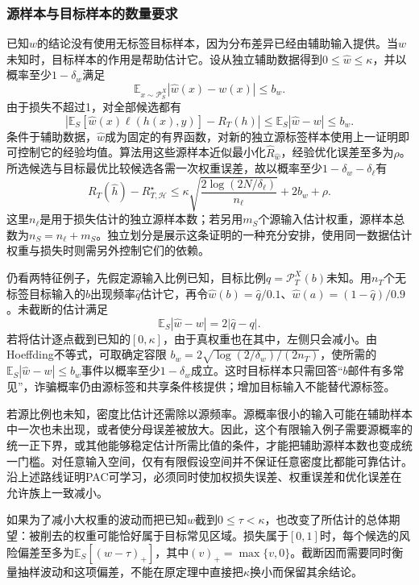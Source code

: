 \subsubsection{源样本与目标样本的数量要求}

已知$w$的结论没有使用无标签目标样本，因为分布差异已经由辅助输入提供。当$w$未知时，目标样本的作用是帮助估计它。设从独立辅助数据得到$0\leq\widehat w\leq\kappa$，并以概率至少$1-\delta_w$满足
\[
 \mathbb E_{x\sim\mathcal P_S^X}|\widehat w(x)-w(x)|\leq b_w.
\]
由于损失不超过1，对全部候选都有
\[
 \left|\mathbb E_S[\widehat w(x)\ell(h(x),y)]-R_T(h)\right|
 \leq\mathbb E_S|\widehat w-w|\leq b_w.
\]
条件于辅助数据，$\widehat w$成为固定的有界函数，对新的独立源标签样本使用上一证明即可控制它的经验均值。算法用这些源样本近似最小化$\widehat R_{\widehat w}$，经验优化误差至多为$\rho$。所选候选与目标最优比较候选各需一次权重误差，故以概率至少$1-\delta_w-\delta_\ell$有
\[
 R_T(\widehat h)-R_{T,\mathcal H}^{\star}
 \leq\kappa\sqrt{\frac{2\log(2N/\delta_\ell)}{n_\ell}}+2b_w+\rho.
\]
这里$n_\ell$是用于损失估计的独立源样本数；若另用$m_S$个源输入估计权重，源样本总数为$n_S=n_\ell+m_S$。独立划分是展示这条证明的一种充分安排，使用同一数据估计权重与损失时则需另外控制它们的依赖。

仍看两特征例子，先假定源输入比例已知，目标比例$q=\mathcal P_T^X(b)$未知。用$n_T$个无标签目标输入的$b$出现频率$\widehat q$估计它，再令$\widehat w(b)=\widehat q/0.1$、$\widehat w(a)=(1-\widehat q)/0.9$。未截断的估计满足
\[
 \mathbb E_S|\widehat w-w|=2|\widehat q-q|.
\]
若将估计逐点截到已知的$[0,\kappa]$，由于真权重也在其中，左侧只会减小。由Hoeffding不等式，可取确定容限
$b_w=2\sqrt{\log(2/\delta_w)/(2n_T)}$，使所需的$\mathbb E_S|\widehat w-w|\leq b_w$事件以概率至少$1-\delta_w$成立。这时目标样本只需回答“$b$邮件有多常见”，诈骗概率仍由源标签和共享条件核提供；增加目标输入不能替代源标签。

若源比例也未知，密度比估计还需除以源频率。源概率很小的输入可能在辅助样本中一次也未出现，或者使分母误差被放大。因此，这个有限输入例子需要源概率的统一正下界，或其他能够稳定估计所需比值的条件，才能把辅助源样本数也变成统一门槛。对任意输入空间，仅有有限假设空间并不保证任意密度比都能可靠估计。沿上述路线证明PAC可学习，必须同时使加权损失误差、权重误差和优化误差在允许族上一致减小。

如果为了减小大权重的波动而把已知$w$截到$0\leq\tau<\kappa$，也改变了所估计的总体期望：被削去的权重可能恰好属于目标常见区域。损失属于$[0,1]$时，每个候选的风险偏差至多为$\mathbb E_S[(w-\tau)_+]$，其中$(v)_+=\max\{v,0\}$。截断因而需要同时衡量抽样波动和这项偏差，不能在原定理中直接把$\kappa$换小而保留其余结论。


